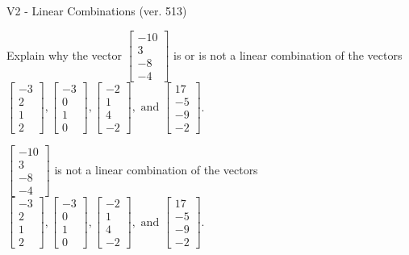 \begin{exercise}
  \begin{exerciseTitle}V2 - Linear Combinations (ver. 513)\end{exerciseTitle}
  \begin{exerciseStatement}
    Explain why the vector \(\left[\begin{array}{c}
-10 \\
3 \\
-8 \\
-4
\end{array}\right]\)  is or is not a linear 
	combination of the vectors \(\left[\begin{array}{c}
-3 \\
2 \\
1 \\
2
\end{array}\right] , \left[\begin{array}{c}
-3 \\
0 \\
1 \\
0
\end{array}\right] , \left[\begin{array}{c}
-2 \\
1 \\
4 \\
-2
\end{array}\right] , \text{ and } \left[\begin{array}{c}
17 \\
-5 \\
-9 \\
-2
\end{array}\right]\).
	


  \end{exerciseStatement}
  \begin{exerciseAnswer}
   \(\left[\begin{array}{c}
-10 \\
3 \\
-8 \\
-4
\end{array}\right]\) 
  	 is not  
	a linear combination of the vectors \(\left[\begin{array}{c}
-3 \\
2 \\
1 \\
2
\end{array}\right] , \left[\begin{array}{c}
-3 \\
0 \\
1 \\
0
\end{array}\right] , \left[\begin{array}{c}
-2 \\
1 \\
4 \\
-2
\end{array}\right] , \text{ and } \left[\begin{array}{c}
17 \\
-5 \\
-9 \\
-2
\end{array}\right]\).


\end{exerciseAnswer}
\end{exercise}
